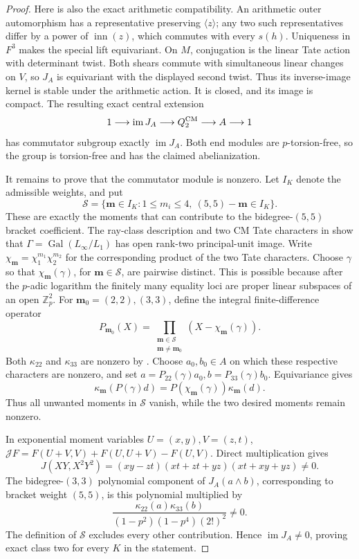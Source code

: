 \begin{proof}
Here is also the exact arithmetic compatibility.
An arithmetic outer automorphism has a representative
preserving \(\langle z\rangle\); any two such
representatives differ by a power of
\(\operatorname{inn}(z)\), which commutes with every
\(s(h)\).  Uniqueness in \(F^3\) makes the special lift
equivariant.  On \(M\), conjugation is the linear
Tate action with determinant twist.  Both shears
commute with simultaneous linear changes on \(V\),
so \(J_A\) is equivariant with the displayed second
twist.  Thus its inverse-image kernel is stable
under the arithmetic action.  It is closed, and its
image is compact.  The resulting exact central extension
\[
 1\longrightarrow\operatorname{im}J_A
 \longrightarrow Q_2^{\rm CM}\longrightarrow A
 \longrightarrow1
\]
has commutator subgroup exactly \(\operatorname{im}J_A\).
Both end modules are \(p\)-torsion-free, so the group
is torsion-free and has the claimed abelianization.

It remains to prove that the commutator module is nonzero.
Let \(I_K\) denote the admissible weights, and put
\[
 \mathcal S=\{\boldsymbol m\in I_K:
  1\leq m_i\leq4,\ (5,5)-\boldsymbol m\in I_K\}.
\]
These are exactly the moments that can contribute
to the bidegree-\((5,5)\) bracket coefficient.
The ray-class description and two CM Tate characters
in \cite[pp.~4--5]{Ishii} show that
\(\Gamma=\operatorname{Gal}(L_\infty/L_1)\) has open
rank-two principal-unit image. Write
\(\chi_{\boldsymbol m}=\chi_1^{m_1}\chi_2^{m_2}\)
for the corresponding product of the two Tate characters. Choose \(\gamma\)
so that \(\chi_{\boldsymbol m}(\gamma)\), for
\(\boldsymbol m\in\mathcal S\), are pairwise distinct.
This is possible because after the \(p\)-adic logarithm
the finitely many equality loci are proper linear
subspaces of an open \(\mathbb Z_p^2\).
For \(\boldsymbol m_0=(2,2),(3,3)\), define the integral
finite-difference operator
\[
 P_{\boldsymbol m_0}(X)=
 \prod_{\substack{\boldsymbol m\in\mathcal S\\
                   \boldsymbol m\ne\boldsymbol m_0}}
       (X-\chi_{\boldsymbol m}(\gamma)).
\]
Both \(\kappa_{22}\) and \(\kappa_{33}\) are nonzero
by \cite[Theorem 2.8(2) and the following Soul\'e-finiteness
paragraph, p.~9]{Ishii}.
Choose \(a_0,b_0\in A\) on which these respective
characters are nonzero, and set
\(a=P_{22}(\gamma)a_0,b=P_{33}(\gamma)b_0\).
Equivariance gives
\[
 \kappa_{\boldsymbol m}(P(\gamma)d)
   =P(\chi_{\boldsymbol m}(\gamma))\kappa_{\boldsymbol m}(d).
\]
Thus all unwanted moments in \(\mathcal S\) vanish,
while the two desired moments remain nonzero.

In exponential moment variables \(U=(x,y),V=(z,t)\),
\(\mathcal JF=F(U+V,V)+F(U,U+V)-F(U,V)\).
Direct multiplication gives
\[
 J(XY,X^2Y^2)
       =(xy-zt)(xt+zt+yz)(xt+xy+yz)\ne0.
\]
The bidegree-\((3,3)\) polynomial component of
\(J_A(a\wedge b)\), corresponding to bracket weight
\((5,5)\), is this polynomial multiplied by
\[
 \frac{\kappa_{22}(a)\kappa_{33}(b)}
      {(1-p^2)(1-p^4)(2!)^2}\ne0.
\]
The definition of \(\mathcal S\) excludes every other
contribution.  Hence \(\operatorname{im}J_A\ne0\),
proving exact class two for every \(K\) in the statement.
\end{proof}


